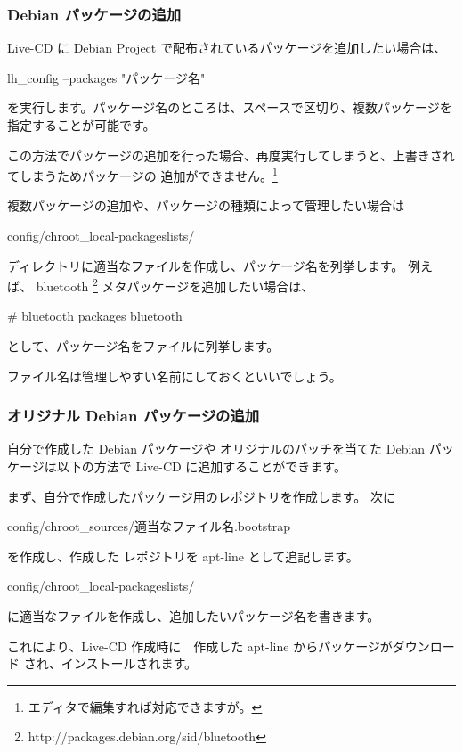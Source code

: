 \documentclass[mingoth,a4paper]{jsarticle}
\begin{document}
\subsubsection{Debian パッケージの追加}
Live-CD に Debian Project で配布されているパッケージを追加したい場合は、
\begin{commandline}
lh_config --packages "パッケージ名"
\end{commandline}
を実行します。パッケージ名のところは、スペースで区切り、複数パッケージを指定することが可能です。

この方法でパッケージの追加を行った場合、再度実行してしまうと、上書きされてしまうためパッケージの
追加ができません。\footnote{エディタで編集すれば対応できますが。}

複数パッケージの追加や、パッケージの種類によって管理したい場合は
\begin{commandline}
config/chroot_local-packageslists/
\end{commandline}
ディレクトリに適当なファイルを作成し、パッケージ名を列挙します。
例えば、 bluetooth
\footnote{http://packages.debian.org/sid/bluetooth} メタパッケージを追加したい場合は、

\begin{commandline}
# bluetooth packages
bluetooth
\end{commandline}
として、パッケージ名をファイルに列挙します。

ファイル名は管理しやすい名前にしておくといいでしょう。

\subsubsection{オリジナル Debian パッケージの追加}

自分で作成した Debian パッケージや オリジナルのパッチを当てた Debian
パッケージは以下の方法で Live-CD に追加することができます。

まず、自分で作成したパッケージ用のレポジトリを作成します。
次に
\begin{commandline}
config/chroot_sources/適当なファイル名.bootstrap
\end{commandline}
を作成し、作成した レポジトリを apt-line として追記します。

\begin{commandline}
config/chroot_local-packageslists/
\end{commandline}
に適当なファイルを作成し、追加したいパッケージ名を書きます。

これにより、Live-CD 作成時に　作成した apt-line からパッケージがダウンロード
され、インストールされます。
\end{document}
